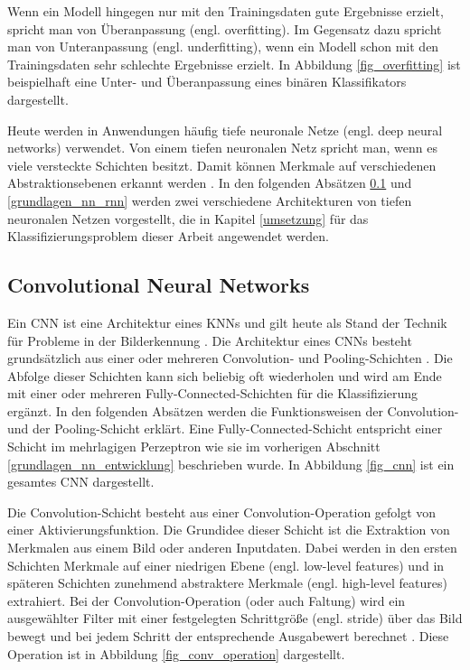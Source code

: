 Wenn ein Modell hingegen nur mit den Trainingsdaten gute Ergebnisse erzielt, spricht man von Überanpassung (engl. overfitting). Im Gegensatz dazu spricht man von Unteranpassung (engl. underfitting), wenn ein Modell schon mit den Trainingsdaten sehr schlechte Ergebnisse erzielt. In Abbildung \ref{fig_overfitting} ist beispielhaft eine Unter- und Überanpassung eines binären Klassifikators dargestellt.

Heute werden in Anwendungen häufig tiefe neuronale Netze (engl. deep neural networks) verwendet. Von einem tiefen neuronalen Netz spricht man, wenn es viele versteckte Schichten besitzt. Damit können Merkmale auf verschiedenen Abstraktionsebenen erkannt werden \cite{lecun2015deep}. In den folgenden Absätzen \ref{grundlagen_nn_cnn} und \ref{grundlagen_nn_rnn} werden zwei verschiedene Architekturen von tiefen neuronalen Netzen vorgestellt, die in Kapitel \ref{umsetzung} für das Klassifizierungsproblem dieser Arbeit angewendet werden.


\subsection{Convolutional Neural Networks}
\label{grundlagen_nn_cnn}

Ein \acf{CNN} ist eine Architektur eines \acp{KNN} und gilt heute als Stand der Technik für Probleme in der Bilderkennung \cite{krizhevsky2012imagenet}. Die Architektur eines \acp{CNN} besteht grundsätzlich aus einer oder mehreren Convolution- und Pooling-Schichten \cite{lecun2010convolutional}. Die Abfolge dieser Schichten kann sich beliebig oft wiederholen und wird am Ende mit einer oder mehreren Fully-Connected-Schichten für die Klassifizierung ergänzt. In den folgenden Absätzen werden die Funktionsweisen der Convolution- und der Pooling-Schicht erklärt. Eine Fully-Connected-Schicht entspricht einer Schicht im mehrlagigen Perzeptron wie sie im vorherigen Abschnitt \ref{grundlagen_nn_entwicklung} beschrieben wurde. In Abbildung \ref{fig_cnn} ist ein gesamtes \ac{CNN} dargestellt.

Die Convolution-Schicht besteht aus einer Convolution-Operation gefolgt von einer Aktivierungsfunktion. Die Grundidee dieser Schicht ist die Extraktion von Merkmalen aus einem Bild oder anderen Inputdaten. Dabei werden in den ersten Schichten Merkmale auf einer niedrigen Ebene (engl. low-level features) und in späteren Schichten zunehmend abstraktere Merkmale (engl. high-level features) extrahiert. Bei der Convolution-Operation (oder auch Faltung) wird ein ausgewählter Filter mit einer festgelegten Schrittgröße (engl. stride) über das Bild bewegt und bei jedem Schritt der entsprechende Ausgabewert berechnet \cite{lecun1998cnn}. Diese Operation ist in Abbildung \ref{fig_conv_operation} dargestellt.

